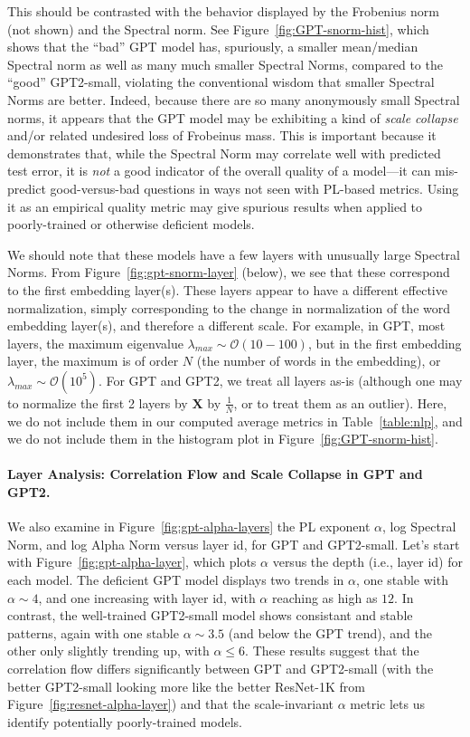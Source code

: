 This should be contrasted with the behavior displayed by the Frobenius norm (not shown) and the Spectral norm.
See Figure~\ref{fig:GPT-snorm-hist}, which shows that the ``bad'' GPT model has, spuriously, a smaller mean/median Spectral norm as well as many much smaller Spectral Norms, compared to the ``good'' GPT2-small, violating the conventional wisdom that smaller Spectral Norms are better.
Indeed, because there are so many anonymously small Spectral norms, it appears that the GPT model may be exhibiting a kind of \emph{scale collapse} and/or related undesired loss of Frobeinus mass.
This is important because it demonstrates that, while the Spectral Norm may correlate well with predicted test error, it is \emph{not} a good indicator of the overall quality of a model---it can mis-predict good-versus-bad questions in ways not seen with PL-based metrics.
Using it as an empirical quality metric may give spurious results when applied to poorly-trained or otherwise deficient models. 

We should note that these models have a few layers with unusually large Spectral Norms.
From Figure~\ref{fig:gpt-snorm-layer} (below), we see that these correspond to the first embedding layer(s).
These layers appear to have a different effective normalization, simply corresponding to the change in normalization of the word embedding layer(s), and therefore a different scale.
For example, in GPT, most layers, the maximum eigenvalue $\lambda_{max}\sim\mathcal{O}(10-100)$, but in the first embedding layer, the maximum is of order $N$ (the number of words in the embedding), or $\lambda_{max}\sim\mathcal{O}(10^{5})$.  
For GPT and GPT2, we treat all layers as-is (although one may to normalize the first 2 layers by  $\mathbf{X}$ by $\frac{1}{N}$, or to treat them as an outlier).
Here, we do not include them in our computed average metrics in Table~\ref{table:nlp}, and we do not include them in the histogram plot in Figure~\ref{fig:GPT-snorm-hist}.


\paragraph{Layer Analysis: Correlation Flow and Scale Collapse in GPT and GPT2.} 

We also examine in Figure~\ref{fig:gpt-alpha-layers} the PL exponent $\alpha$, log Spectral Norm, and log Alpha Norm versus layer id, for GPT and GPT2-small.
Let's start with Figure~\ref{fig:gpt-alpha-layer}, which plots $\alpha$ versus the depth (i.e., layer id) for each model.
The deficient GPT model displays two trends in $\alpha$, one stable with $\alpha\sim 4$, and one increasing with layer id, with $\alpha$ reaching as high as $12$.
In contrast, the well-trained GPT2-small model shows consistant and stable patterns, again with one stable $\alpha\sim 3.5$ (and below the GPT trend), and the other only slightly trending up, with $\alpha\le 6$. 
These results suggest that the correlation flow differs significantly between GPT and GPT2-small (with the better GPT2-small looking more like the better ResNet-1K from Figure~\ref{fig:resnet-alpha-layer}) and that the scale-invariant $\alpha$ metric lets us identify potentially poorly-trained models.

